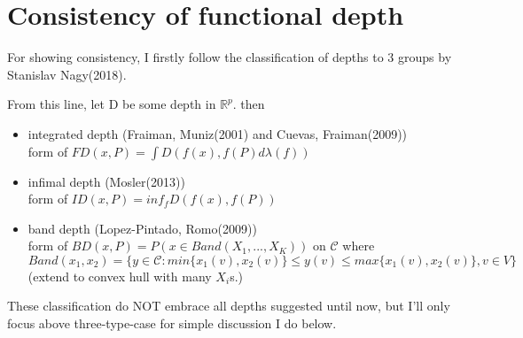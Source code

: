 \documentclass[aspectratio=169,ignorenonframetext,9pt]{beamer}
\theoremstyle{plain}
\theoremstyle{definition}
\begin{document}
\section{Consistency of functional depth}
For showing consistency, I firstly follow the classification of depths to 3 groups by Stanislav Nagy(2018).

From this line, let D be some depth in $\mathbb{R}^p$. then
\begin{itemize}
    \item integrated depth (Fraiman, Muniz(2001) and  Cuevas, Fraiman(2009)) \\
    form of \(FD(x,P)=\int D(f(x),f(P)d\lambda(f))\)
    \item infimal depth (Mosler(2013))\\
    form of \(ID(x,P)=inf_f D(f(x),f(P))\)
    \item band depth (Lopez-Pintado, Romo(2009))\\
    form of \(BD(x,P)=P(x\in Band(X_1,...,X_K))\) on $\mathcal{C}$
    where $Band(x_1,x_2)=\{y\in\mathcal{C}: min\{x_1(v),x_2(v)\} \leq y(v) \leq max\{x_1(v),x_2(v)\}, v\in V\}$ \\
    (extend to convex hull with many $X_i$s.)
\end{itemize}
These classification do NOT embrace all depths suggested until now, but I'll only focus above three-type-case
for simple discussion I do below.
\end{document}
